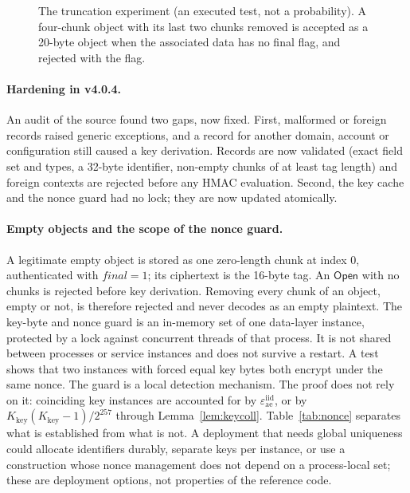 \documentclass[pdflatex,sn-mathphys-num,twocolumn]{sn-jnl}
\theoremstyle{plain}
\theoremstyle{definition}
\begin{document}
\begin{figure}[t]
\centering
\resizebox{\linewidth}{!}{}
\caption{The truncation experiment (an executed test, not a probability). A four-chunk object with its last two chunks removed is accepted as a 20-byte object when the associated data has no final flag, and rejected with the flag.}\label{fig:truncation}
\end{figure}

\paragraph{Hardening in v4.0.4.}
An audit of the source found two gaps, now fixed. First, malformed or foreign records raised generic exceptions, and a record for another domain, account or configuration still caused a key derivation. Records are now validated (exact field set and types, a 32-byte identifier, non-empty chunks of at least tag length) and foreign contexts are rejected before any HMAC evaluation. Second, the key cache and the nonce guard had no lock; they are now updated atomically.

\paragraph{Empty objects and the scope of the nonce guard.}
A legitimate empty object is stored as one zero-length chunk at index $0$, authenticated with $\mathit{final}=1$; its ciphertext is the 16-byte tag. An $\mathsf{Open}$ with no chunks is rejected before key derivation. Removing every chunk of an object, empty or not, is therefore rejected and never decodes as an empty plaintext. The key-byte and nonce guard is an in-memory set of one data-layer instance, protected by a lock against concurrent threads of that process. It is not shared between processes or service instances and does not survive a restart. A test shows that two instances with forced equal key bytes both encrypt under the same nonce. The guard is a local detection mechanism. The proof does not rely on it: coinciding key instances are accounted for by $\varepsilon^{\mathrm{iid}}_{\mathrm{ae}}$, or by $K_{\mathrm{key}}(K_{\mathrm{key}}-1)/2^{257}$ through Lemma~\ref{lem:keycoll}. Table~\ref{tab:nonce} separates what is established from what is not. A deployment that needs global uniqueness could allocate identifiers durably, separate keys per instance, or use a construction whose nonce management does not depend on a process-local set; these are deployment options, not properties of the reference code.
\end{document}
